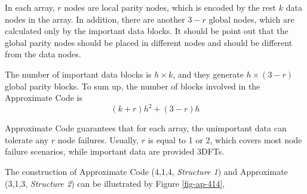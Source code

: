 \documentclass[sigconf]{acmart}
\begin{document}
In each array, $r$ nodes are local parity nodes, which is encoded by the rest $k$ data nodes in the array.
In addition, there are another $3-r$ global nodes, which are calculated only by the important data blocks. It should be point out that the global parity nodes should be placed in different nodes and should be different from the data nodes. 

The number of important data blocks is $h \times k$, and they generate $h \times (3-r)$ global parity blocks.
To sum up, the number of blocks involved in the Approximate Code is 
$$(k+r)h^2 + (3-r) h$$


Approximate Code guarantees that for each array, the unimportant data can tolerate any $r$ node failures. Usually, $r$ is equal to 1 or 2, which covers most node failure scenarios, while important data are provided 3DFTs.

The construction of Approximate Code (4,1,4, \emph{Structure 1}) and Approximate (3,1,3, \emph{Structure 2}) can be illustrated by Figure \ref{fig-ap-414},

\end{document}
